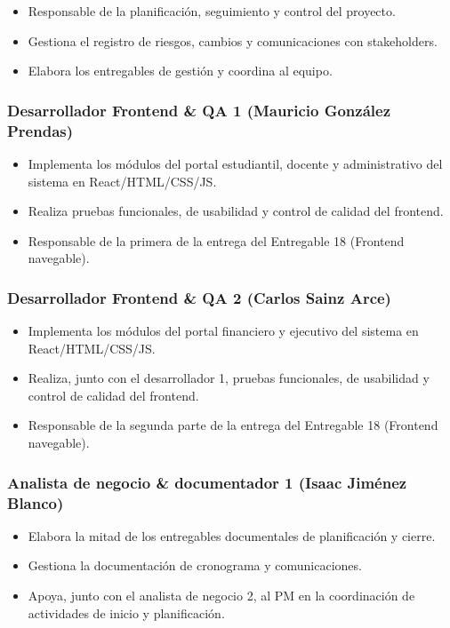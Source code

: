 \documentclass[11pt,spanish]{article}
\begin{document}
\begin{itemize}
    \item Responsable de la planificación, seguimiento y control del proyecto.
    \item Gestiona el registro de riesgos, cambios y comunicaciones con stakeholders.
    \item Elabora los entregables de gestión y coordina al equipo.
\end{itemize}

\subsubsection{Desarrollador Frontend \& QA 1 (Mauricio González Prendas)}

\begin{itemize}
    \item Implementa los módulos del portal estudiantil, docente y administrativo del sistema en React/HTML/CSS/JS.
    \item Realiza pruebas funcionales, de usabilidad y control de calidad del frontend.
    \item Responsable de la primera de la entrega del Entregable 18 (Frontend navegable).
\end{itemize}

\subsubsection{Desarrollador Frontend \& QA 2 (Carlos Sainz Arce)}

\begin{itemize}
    \item Implementa los módulos del portal financiero y ejecutivo del sistema en React/HTML/CSS/JS.
    \item Realiza, junto con el desarrollador 1, pruebas funcionales, de usabilidad y control de calidad del frontend.
    \item Responsable de la segunda parte de la entrega del Entregable 18 (Frontend navegable).
\end{itemize}

\subsubsection{Analista de negocio \& documentador 1 (Isaac Jiménez Blanco)}

\begin{itemize}
    \item Elabora la mitad de los entregables documentales de planificación y cierre.
    \item Gestiona la documentación de cronograma y comunicaciones.
    \item Apoya, junto con el analista de negocio 2, al PM en la coordinación de actividades de inicio y planificación.
\end{itemize}
\end{document}
